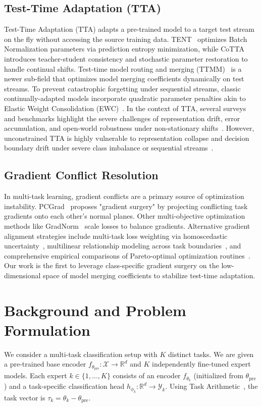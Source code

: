 \documentclass{article}
\theoremstyle{plain}
\theoremstyle{definition}
\theoremstyle{remark}
\begin{document}
\subsection{Test-Time Adaptation (TTA)}
Test-Time Adaptation (TTA) adapts a pre-trained model to a target test stream on the fly without accessing the source training data. TENT~\cite{wang2021tent} optimizes Batch Normalization parameters via prediction entropy minimization, while CoTTA~\cite{wang2022continual} introduces teacher-student consistency and stochastic parameter restoration to handle continual shifts. Test-time model routing and merging (TTMM)~\cite{zhao2024dynamic, li2024test} is a newer sub-field that optimizes model merging coefficients dynamically on test streams. To prevent catastrophic forgetting under sequential streams, classic continually-adapted models incorporate quadratic parameter penalties akin to Elastic Weight Consolidation (EWC)~\cite{kirkpatrick2017overcoming}. In the context of TTA, several surveys and benchmarks highlight the severe challenges of representation drift, error accumulation, and open-world robustness under non-stationary shifts~\cite{song2023test}. However, unconstrained TTA is highly vulnerable to representation collapse and decision boundary drift under severe class imbalance or sequential streams~\cite{dobler2022robust, shao2023test}.

\subsection{Gradient Conflict Resolution}
In multi-task learning, gradient conflicts are a primary source of optimization instability. PCGrad~\cite{yu2020gradient} proposes "gradient surgery" by projecting conflicting task gradients onto each other's normal planes. Other multi-objective optimization methods like GradNorm~\cite{chen2018gradnorm} scale losses to balance gradients. Alternative gradient alignment strategies include multi-task loss weighting via homoscedastic uncertainty~\cite{kendall2018multi}, multilinear relationship modeling across task boundaries~\cite{long2017learning}, and comprehensive empirical comparisons of Pareto-optimal optimization routines~\cite{gong2019comparison}. Our work is the first to leverage class-specific gradient surgery on the low-dimensional space of model merging coefficients to stabilize test-time adaptation.

\section{Background and Problem Formulation}
\label{sec:background}
We consider a multi-task classification setup with $K$ distinct tasks. We are given a pre-trained base encoder $f_{\theta_{\text{pre}}} : \mathcal{X} \to \mathbb{R}^d$ and $K$ independently fine-tuned expert models. Each expert $k \in \{1, \dots, K\}$ consists of an encoder $f_{\theta_k}$ (initialized from $\theta_{\text{pre}}$) and a task-specific classification head $h_{\phi_k} : \mathbb{R}^d \to \mathcal{Y}_k$. Using Task Arithmetic~\cite{ilharco2022editing}, the task vector is $\tau_k = \theta_k - \theta_{\text{pre}}$.
\end{document}
